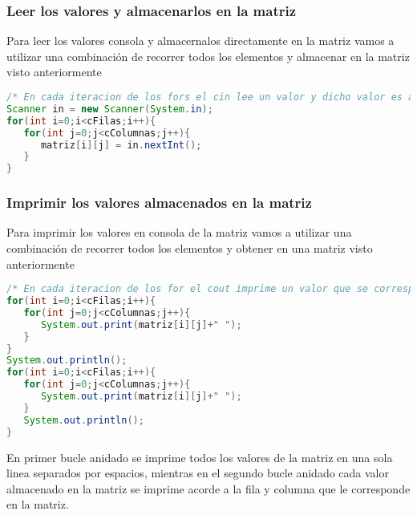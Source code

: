 \subsubsection{Leer los valores y almacenarlos en la matriz}
Para leer los valores consola y almacernalos directamente en la matriz vamos a utilizar una combinación de recorrer todos los elementos y almacenar en la matriz visto anteriormente

\begin{lstlisting}[language=Java]
/* En cada iteracion de los fors el cin lee un valor y dicho valor es almacenado en la matriz en la posicion que indique el valor de las variable i y j en esa iteracion, en la primera el valor seria (0;0), en la segunda (0;1) y asi sucesivamente. Tener en cuenta que los valores de i esten en rango de posiciones validas de la filas y la j en el rango de posiciones validas de la columnas de la matriz */
Scanner in = new Scanner(System.in);
for(int i=0;i<cFilas;i++){
   for(int j=0;j<cColumnas;j++){
      matriz[i][j] = in.nextInt();
   }		
}
\end{lstlisting}

\subsubsection{Imprimir los valores almacenados en la matriz}

Para imprimir los valores en consola de la matriz vamos a utilizar una combinación de recorrer todos los elementos y obtener en una matriz visto anteriormente

\begin{lstlisting}[language=Java]
/* En cada iteracion de los for el cout imprime un valor que se corresponde con el almacenado en la matriz en la posicion que indique el valor de las variables i (fila) y j (columna)  en esa iteracion, en la primera el valor seria (0;0), en la segunda (0;1) y asi sucesivamente. Tener en cuenta que los valores de i esten en rango de posiciones validas de la filas y la j en el rango de posiciones validas de la columnas de la matriz*/
for(int i=0;i<cFilas;i++){
   for(int j=0;j<cColumnas;j++){
      System.out.print(matriz[i][j]+" ");
   }
} 
System.out.println();
for(int i=0;i<cFilas;i++){
   for(int j=0;j<cColumnas;j++){
      System.out.print(matriz[i][j]+" ");
   }
   System.out.println();
}
\end{lstlisting}

En primer bucle anidado se imprime todos los valores de la matriz en una sola linea separados por espacios, mientras en el segundo bucle anidado cada valor almacenado en la matriz  se imprime acorde a la fila y columna que le corresponde en la matriz.